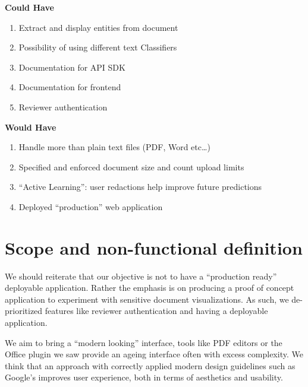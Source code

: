 \documentclass[\version]{l4proj}
\begin{document}
\begin{adjustbox}{width=\textwidth,center}
    \begin{minipage}[t]{.5\linewidth}
        \centerline{\textbf{Could Have}}
        \begin{enumerate}[label=\textbf{C\arabic*}]
            \item Extract and display entities from document
            \item Possibility of using different text Classifiers
            \item Documentation for API SDK
            \item Documentation for frontend
            \item Reviewer authentication
        \end{enumerate}
    \end{minipage}
    \hfill
    \noindent
    \begin{minipage}[t]{.5\linewidth}
        \centerline{\textbf{Would Have}}
        \begin{enumerate}[label=\textbf{W\arabic*}]
            \item Handle more than plain text files (PDF, Word etc…)
            \item Specified and enforced document size and count upload limits
            \item ``Active Learning'': user redactions help improve future predictions
            \item Deployed ``production'' web application
        \end{enumerate}
    \end{minipage}
\end{adjustbox}
\section{Scope and non-functional definition}

We should reiterate that our objective is not to have a ``production ready'' deployable application.
Rather the emphasis is on producing a proof of concept application to experiment with sensitive document visualizations.
As such, we de-prioritized features like reviewer authentication and having a deployable application.

We aim to bring a ``modern looking'' interface, tools like PDF editors or the Office plugin we saw provide an ageing interface often with excess complexity.
We think that an approach with correctly applied modern design guidelines such as Google's \textcite{MaterialDesign} improves user experience, both in terms of aesthetics and usability.
\end{document}
